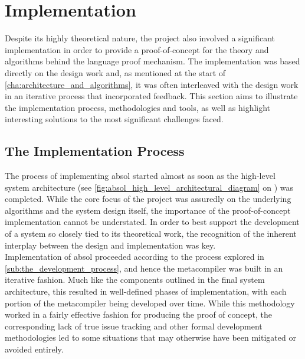 
\chapter{Implementation} %
\label{cha:implementation}
Despite its highly theoretical nature, the project also involved a significant implementation in order to provide a proof-of-concept for the theory and algorithms behind the language proof mechanism. 
The implementation was based directly on the design work and, as mentioned at the start of \autoref{cha:architecture_and_algorithms}, it was often interleaved with the design work in an iterative process that incorporated feedback. 
This section aims to illustrate the implementation process, methodologies and tools, as well as highlight interesting solutions to the most significant challenges faced. 

\section{The Implementation Process} %
\label{sec:the_implementation_process}

The process of implementing \gls{absol} started almost as soon as the high-level system architecture (see \autoref{fig:absol_high_level_architectural_diagram} on ) was completed. 
While the core focus of the project was assuredly on the underlying algorithms and the system design itself, the importance of the proof-of-concept implementation cannot be understated. 
In order to best support the development of a system so closely tied to its theoretical work, the recognition of the inherent interplay between the design and implementation was key. \\

Implementation of \gls{absol} proceeded according to the process explored in \autoref{sub:the_development_process}, and hence the metacompiler was built in an iterative fashion.
Much like the components outlined in the final system architecture, this resulted in well-defined phases of implementation, with each portion of the metacompiler being developed over time. 
While this methodology worked in a fairly effective fashion for producing the proof of concept, the corresponding lack of true issue tracking and other formal development methodologies led to some situations that may otherwise have been mitigated or avoided entirely.

